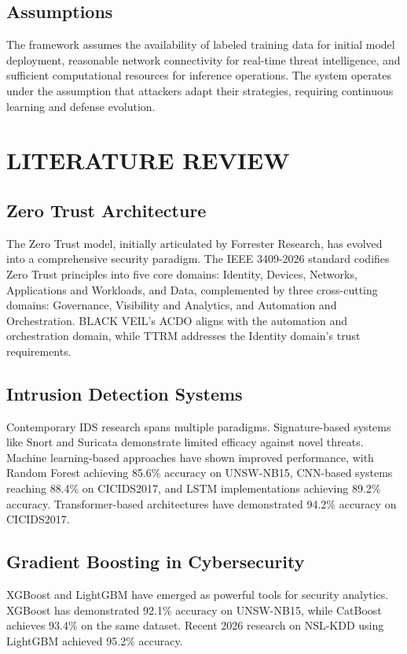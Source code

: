 \documentclass[12pt]{article}
\begin{document}
\subsection{Assumptions}
The framework assumes the availability of labeled training data for initial model deployment, reasonable network connectivity for real-time threat intelligence, and sufficient computational resources for inference operations. The system operates under the assumption that attackers adapt their strategies, requiring continuous learning and defense evolution.

\newpage

\section{LITERATURE REVIEW}

\subsection{Zero Trust Architecture}
The Zero Trust model, initially articulated by Forrester Research, has evolved into a comprehensive security paradigm. The IEEE 3409-2026 standard codifies Zero Trust principles into five core domains: Identity, Devices, Networks, Applications and Workloads, and Data, complemented by three cross-cutting domains: Governance, Visibility and Analytics, and Automation and Orchestration. BLACK VEIL's ACDO aligns with the automation and orchestration domain, while TTRM addresses the Identity domain's trust requirements.

\subsection{Intrusion Detection Systems}
Contemporary IDS research spans multiple paradigms. Signature-based systems like Snort and Suricata demonstrate limited efficacy against novel threats. Machine learning-based approaches have shown improved performance, with Random Forest achieving 85.6\% accuracy on UNSW-NB15, CNN-based systems reaching 88.4\% on CICIDS2017, and LSTM implementations achieving 89.2\% accuracy. Transformer-based architectures have demonstrated 94.2\% accuracy on CICIDS2017.

\subsection{Gradient Boosting in Cybersecurity}
XGBoost and LightGBM have emerged as powerful tools for security analytics. XGBoost has demonstrated 92.1\% accuracy on UNSW-NB15, while CatBoost achieves 93.4\% on the same dataset. Recent 2026 research on NSL-KDD using LightGBM achieved 95.2\% accuracy.
\end{document}
